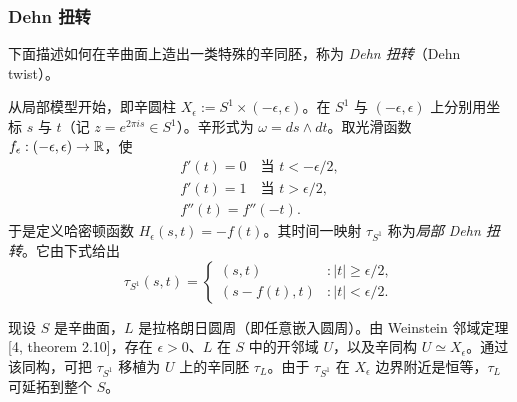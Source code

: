 
\subsubsection{Dehn 扭转}
\label{subsec:dehn}

下面描述如何在辛曲面上造出一类特殊的辛同胚，称为 \emph{Dehn 扭转}（Dehn twist）。

从局部模型开始，即辛圆柱 $X_\epsilon:=S^1\times(-\epsilon,\epsilon)$。在 $S^1$ 与 $(-\epsilon,\epsilon)$ 上分别用坐标 $s$ 与 $t$（记 $z=e^{2\pi i s}\in S^1$）。辛形式为 $\omega=ds\wedge dt$。取光滑函数 $f_\epsilon: (-\epsilon,\epsilon)\to\mathbb{R}$，使
\begin{gather*}
  f'(t) = 0 \quad \text{当 } t<-\epsilon/2,\\
  f'(t) = 1 \quad \text{当 } t>\epsilon/2,\\
  f''(t) = f''(-t).
\end{gather*}
于是定义哈密顿函数 $H_\epsilon(s,t)=-f(t)$。其时间一映射 $\tau_{S^1}$ 称为\emph{局部 Dehn 扭转}。它由下式给出
\[
  \tau_{S^1}(s,t) =
  \begin{cases}
    (s,t) & : |t|\ge \epsilon/2,\\
    (s-f(t),t) & : |t|<\epsilon/2 .
  \end{cases}
\]



现设 $S$ 是辛曲面，$L$ 是拉格朗日圆周（即任意嵌入圆周）。由 Weinstein 邻域定理 [4, theorem 2.10]，存在 $\epsilon>0$、$L$ 在 $S$ 中的开邻域 $U$，以及辛同构 $U\simeq X_\epsilon$。通过该同构，可把 $\tau_{S^1}$ 移植为 $U$ 上的辛同胚 $\tau_L$。由于 $\tau_{S^1}$ 在 $X_\epsilon$ 边界附近是恒等，$\tau_L$ 可延拓到整个 $S$。

